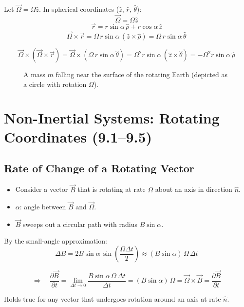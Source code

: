 Let $\vec{\Omega} = \Omega\hat{z}$. In spherical coordinates ($\hat{z}$, $\hat{r}$, $\hat{\theta}$):
\[
  \vec{\Omega} = \Omega\hat{z}
\]
\[
  \vec{r} = r\sin\alpha\,\hat{\rho} + r\cos\alpha\,\hat{z}
\]
\[
  \vec{\Omega}\times\vec{r} = \Omega\,r\sin\alpha\,(\hat{z}\times\hat{\rho}) = \Omega\,r\sin\alpha\,\hat{\theta}
\]

\[
  \vec{\Omega}\times(\vec{\Omega}\times\vec{r}) = \vec{\Omega}\times(\Omega\,r\sin\alpha\,\hat{\theta})
  = \Omega^2 r\sin\alpha\,(\hat{z}\times\hat{\theta})
  = -\Omega^2 r\sin\alpha\,\hat{\rho}
\]

\begin{example}
\begin{figure}[H]
  \centering
  \caption{A mass $m$ falling near the surface of the rotating Earth (depicted as a circle with rotation $\Omega$).}
\end{figure}
\end{example}

\chapter{Non-Inertial Systems: Rotating Coordinates (9.1--9.5)}

\section{Rate of Change of a Rotating Vector}

\begin{itemize}
  \item Consider a vector $\vec{B}$ that is rotating at rate $\Omega$ about an axis in direction $\hat{n}$.
  \item $\alpha$: angle between $\vec{B}$ and $\vec{\Omega}$.
  \item $\vec{B}$ sweeps out a circular path with radius $B\sin\alpha$.
\end{itemize}

By the small-angle approximation:
\[
  \Delta B = 2B\sin\alpha\,\sin\!\left(\frac{\Omega\Delta t}{2}\right) \approx (B\sin\alpha)\,\Omega\,\Delta t
\]

\[
  \Rightarrow \quad \frac{\partial\vec{B}}{\partial t} = \lim_{\Delta t\to 0}\frac{B\sin\alpha\,\Omega\,\Delta t}{\Delta t} = (B\sin\alpha)\,\Omega = \vec{\Omega}\times\vec{B} = \frac{\partial\vec{B}}{\partial t}
\]

Holds true for any vector that undergoes rotation around an axis at rate $\hat{n}$.

